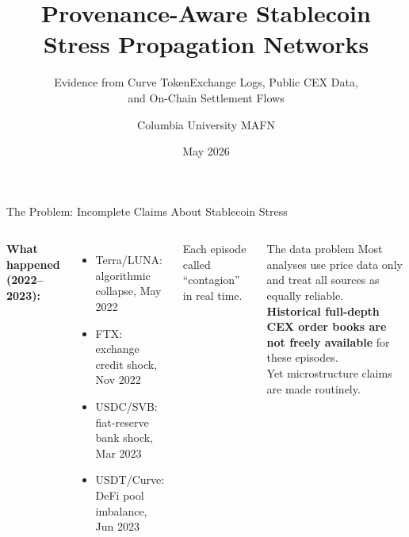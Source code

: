 \documentclass[aspectratio=169,11pt]{beamer}
\title{Provenance-Aware Stablecoin\\Stress Propagation Networks}
\subtitle{Evidence from Curve TokenExchange Logs, Public CEX Data,\\
          and On-Chain Settlement Flows}
\author{Columbia University MAFN}
\date{May 2026}
\begin{document}
{
\begin{frame}[plain]
\titlepage
\end{frame}
}

\begin{frame}{The Problem: Incomplete Claims About Stablecoin Stress}
\begin{columns}[T]
\textbf{What happened (2022--2023):}
\begin{itemize}
  \item Terra/LUNA: algorithmic collapse, May 2022
  \item FTX: exchange credit shock, Nov 2022
  \item USDC/SVB: fiat-reserve bank shock, Mar 2023
  \item USDT/Curve: DeFi pool imbalance, Jun 2023
\end{itemize}
\vspace{6pt}
Each episode called ``contagion'' in real time.
\begin{block}{The data problem}
Most analyses use price data only and treat all sources as equally reliable.\\[4pt]
\textbf{Historical full-depth CEX order books are not freely available} for these episodes.\\[4pt]
Yet microstructure claims are made routinely.
\end{block}
\end{columns}
\end{frame}
\end{document}
